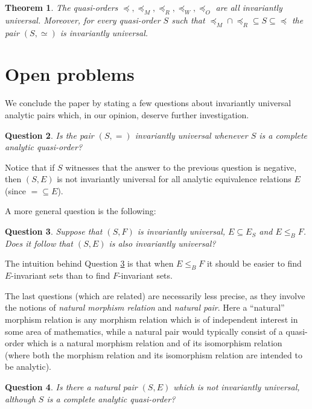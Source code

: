 \documentclass{amsart}
\newtheorem{theorem}{Theorem}[section]
\newtheorem{question}[theorem]{Question}
\theoremstyle{definition}
\theoremstyle{remark}
\begin{document}
\begin{theorem}
 The quasi-orders $\preceq,\preceq_M, \preceq_R, \preceq_W, \preceq_O$ are all invariantly universal. Moreover, for every quasi-order $S$ such that ${{\preceq_M} \cap {\preceq_R}} \subseteq S \subseteq {\preceq}$ the pair $(S, \simeq)$ is invariantly universal.
\end{theorem}

\section{Open problems}
We conclude the paper by stating a few questions about invariantly
universal analytic pairs which, in our opinion, deserve further
investigation.

\begin{question}\label{q:=}
Is the pair $(S,{=})$ invariantly universal whenever $S$ is a complete
analytic quasi-order?
\end{question}

Notice that if $S$ witnesses that the answer to the previous question
is negative, then $(S,E)$ is not invariantly universal for all analytic
equivalence relations $E$ (since ${=} \subseteq E$).

A more general question is the following:

\begin{question}\label{q:leq}
Suppose that $(S,F)$ is invariantly universal, $E \subseteq E_S$ and $E
\leq_B F$. Does it follow that $(S,E)$ is also invariantly universal?
\end{question}

The intuition behind Question \ref{q:leq} is that when $E \leq_B F$ it
should be easier to find $E$-invariant sets than to find $F$-invariant
sets.

The last questions (which are related) are necessarily less precise, as
they involve the notions of \emph{natural morphism relation} and
\emph{natural pair}. Here a ``natural'' morphism relation is any
morphism relation which is of independent interest in some area of
mathematics, while a natural pair would typically consist of a
quasi-order which is a natural morphism relation and of its isomorphism
relation (where both the morphism relation and its isomorphism relation are intended to be analytic).

\begin{question}
Is there a natural pair $(S,E)$ which is not invariantly universal,
although $S$ is a complete analytic quasi-order?
\end{question}
\end{document}
